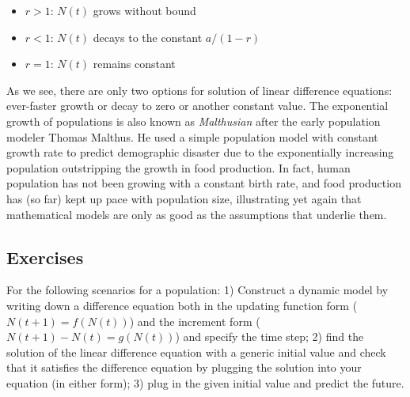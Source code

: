 \documentclass[
  letterpaper,
  DIV=11,
  numbers=noendperiod]{scrreprt}
\providecommand{\tightlist}{%
  \setlength{\itemsep}{0pt}\setlength{\parskip}{0pt}}\usepackage{longtable,booktabs,array}
\begin{document}
\begin{itemize}
\tightlist
\item
  \(r > 1\): \(N(t)\) grows without bound
\item
  \(r < 1\): \(N(t)\) decays to the constant \(a/(1-r)\)
\item
  \(r = 1\): \(N(t)\) remains constant
\end{itemize}

As we see, there are only two options for solution of linear difference
equations: ever-faster growth or decay to zero or another constant
value. The exponential growth of populations is also known as
 \emph{Malthusian} after the early
population modeler Thomas Malthus. He used a simple population model
with constant growth rate to predict demographic disaster due to the
exponentially increasing population outstripping the growth in food
production. In fact, human population has not been growing with a
constant birth rate, and food production has (so far) kept up pace with
population size, illustrating yet again that mathematical models are
only as good as the assumptions that underlie them.

\hypertarget{exercises-18}{%
\subsection{Exercises}\label{exercises-18}}

For the following scenarios for a population: 1) Construct a dynamic
model by writing down a difference equation both in the updating
function form (\(N(t+1) = f(N(t))\)) and the increment form
(\(N(t+1) - N(t) = g(N(t))\)) and specify the time step; 2) find the
solution of the linear difference equation with a generic initial value
and check that it satisfies the difference equation by plugging the
solution into your equation (in either form); 3) plug in the given
initial value and predict the future.
\end{document}
